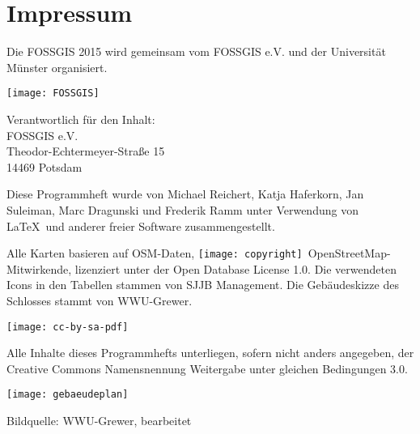 
\newpage


\newpage
\section*{Impressum}
\label{impressum}
\vspace{-0.5em}


\RaggedRight
Die FOSSGIS 2015 wird gemeinsam vom FOSSGIS e.V. und der Universität Münster 
organisiert.

\vspace{0.5em}
	\texttt{[image: FOSSGIS]}

\vspace{0.5em}
\noindent Verantwortlich für den Inhalt:\\
FOSSGIS e.V.\\
Theodor-Echtermeyer-Straße 15\\
14469 Potsdam

\vspace{1em}
\noindent Diese Programmheft wurde von Michael Reichert, Katja Haferkorn, 
Jan Suleiman, Marc Dragunski und Frederik Ramm unter Verwendung von \LaTeX\ und anderer freier Software zusammengestellt. 

\vspace{0.5em}

\noindent Alle Karten basieren auf OSM-Daten, 
\texttt{[image: copyright]}~Open\-Street\-Map-Mitwirkende, lizenziert unter der Open Database License 1.0.
Die verwendeten Icons in den Tabellen stammen von SJJB Management. Die Gebäudeskizze des Schlosses stammt von WWU-Grewer.



\vspace{1em}
\noindent \begin{minipage}[htbp]{0.2\textwidth}
\noindent\texttt{[image: cc-by-sa-pdf]}
\end{minipage}
\hfill
\begin{minipage}[hbtp]{0.74\textwidth}\RaggedRight
Alle Inhalte dieses Programmhefts unterliegen, sofern nicht anders angegeben, 
der Creative Commons Namensnennung Weitergabe unter gleichen Bedingungen 3.0.
\end{minipage}



\begin{landscape}
	\label{gebaeudeplan}
	\texttt{[image: gebaeudeplan]}
	
	{\small Bildquelle: WWU-Grewer, bearbeitet}
\end{landscape}

